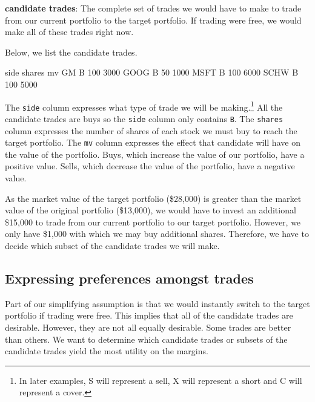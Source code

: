 \documentclass{article}
\begin{document}
\begin{description}

\item{\bf{candidate trades}}: The complete set of trades we would have
to make to trade from our current portfolio to the target portfolio.
If trading were free, we would make all of these trades right now.

\end{description}

Below, we list the candidate trades.

\begin{Schunk}
\begin{Soutput}
     side shares   mv
GM      B    100 3000
GOOG    B     50 1000
MSFT    B    100 6000
SCHW    B    100 5000
\end{Soutput}
\end{Schunk}

The \texttt{side} column expresses what type of trade we will be
making.\protect\footnote{In later examples, S will represent a sell, X
will represent a short and C will represent a cover.}  All the
candidate trades are buys so the \texttt{side} column only contains
\texttt{B}.  The \texttt{shares} column expresses the number of shares
of each stock we must buy to reach the target portfolio.  The
\texttt{mv} column expresses the effect that candidate will have on
the value of the portfolio.  Buys, which increase the value of our
portfolio, have a positive value.  Sells, which decrease the value of
the portfolio, have a negative value.

As the market value of the target portfolio
(\$28,000) is
greater than the market value of the original portfolio
(\$13,000),
we would have to invest an additional
\$15,000
to trade from our current portfolio to our target portfolio.  However,
we only have \$1,000 with which we may buy additional shares.
Therefore, we have to decide which subset of the candidate trades we
will make.

\subsection{Expressing preferences amongst trades}

Part of our simplifying assumption is that we would instantly switch
to the target portfolio if trading were free.  This implies that all of
the candidate trades are desirable.  However, they are not all equally
desirable.  Some trades are better than others.  We want to determine
which candidate trades or subsets of the candidate trades yield the
most utility on the margins.
\end{document}
